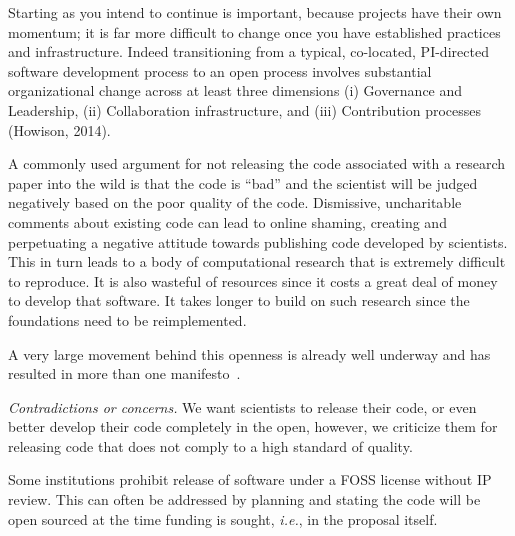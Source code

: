 \documentclass[a4paper,UKenglish]{dagman}
\newcommand{\ie}{\emph{i.e.},\xspace}
\begin{document}
Starting as you intend to continue is important, because projects have their own momentum; it is far more difficult to change once you have established practices and infrastructure. Indeed transitioning from a typical, co-located, PI-directed software development process to an open process involves substantial organizational change across at least three dimensions (i) Governance and Leadership, (ii) Collaboration infrastructure, and (iii) Contribution processes (Howison, 2014). 

A commonly used argument for not releasing the code associated with a research paper into the wild is that the code is ``bad'' and the scientist will be judged negatively based on the poor quality of the code.
Dismissive, uncharitable comments about existing code can lead to online shaming, creating and perpetuating a negative attitude towards publishing code developed by scientists.
This in turn leads to a body of computational research that is extremely difficult to reproduce. It is also wasteful of resources since it costs a great deal of money to develop that software. It takes longer to build on such research since the foundations need to be reimplemented.

A very large movement behind this openness is already well underway and has resulted in more than one manifesto~\cite{barba_reproducibility_2012,alex_holcombe_open_2011}.

\emph{Contradictions or concerns.}
We want scientists to release their code, or even better develop their code completely in the open, however, we criticize them for releasing code that does not comply to a high standard of quality. 

Some institutions prohibit release of software under a FOSS license without IP review. This can often be addressed by planning and stating the code will be open sourced at the time funding is sought, \ie in the proposal itself.
\end{document}
